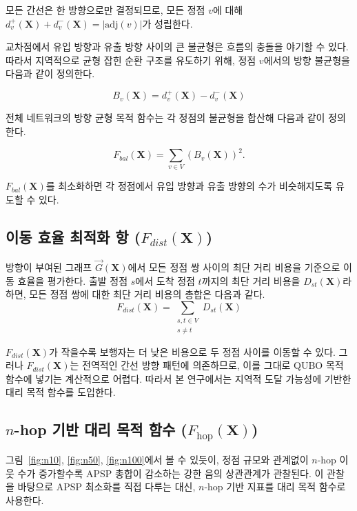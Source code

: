 \documentclass[11pt,a4paper]{article}
\begin{document}
모든 간선은 한 방향으로만 결정되므로, 모든 정점 $v$에 대해
$d_v^+ (\mathbf{X}) + d_v^- (\mathbf{X}) = |\mathrm{adj}(v)|$가 성립한다.

교차점에서 유입 방향과 유출 방향 사이의 큰 불균형은 흐름의 충돌을
야기할 수 있다.
따라서 지역적으로 균형 잡힌 순환 구조를 유도하기 위해, 정점 $v$에서의
방향 불균형을 다음과 같이 정의한다.

\begin{equation}
B_v(\mathbf{X}) = d_v^+ (\mathbf{X}) - d_v^- (\mathbf{X})
\end{equation}

전체 네트워크의 방향 균형 목적 함수는 각 정점의 불균형을 합산해
다음과 같이 정의한다.

\begin{equation}
F_{bal}(\mathbf{X}) = \sum_{v \in V}(B_v(\mathbf{X}))^2.
\end{equation}

$F_{bal}(\mathbf{X})$를 최소화하면 각 정점에서 유입 방향과 유출 방향의
수가 비슷해지도록 유도할 수 있다.

\subsection{이동 효율 최적화 항 ($F_{dist}(\mathbf{X})$)}
방향이 부여된 그래프 $\vec{G}(\mathbf{X})$에서 모든 정점 쌍 사이의
최단 거리 비용을 기준으로 이동 효율을 평가한다.
출발 정점 $s$에서 도착 정점 $t$까지의 최단 거리 비용을
$D_{st}(\mathbf{X})$라 하면, 모든 정점 쌍에 대한 최단 거리 비용의 총합은
다음과 같다.
\begin{equation}
F_{dist}(\mathbf{X}) =
\sum_{\substack{s,t \in V\\s \neq t}} D_{st}(\mathbf{X})
\end{equation}

$F_{dist}(\mathbf{X})$가 작을수록 보행자는 더 낮은 비용으로 두 정점
사이를 이동할 수 있다.
그러나 $F_{dist}(\mathbf{X})$는 전역적인 간선 방향 패턴에 의존하므로,
이를 그대로 QUBO 목적 함수에 넣기는 계산적으로 어렵다.
따라서 본 연구에서는 지역적 도달 가능성에 기반한 대리 목적 함수를
도입한다.

\subsection{$n$-hop 기반 대리 목적 함수 ($F_{\mathrm{hop}}(\mathbf{X})$)}
그림~\ref{fig:n10}, \ref{fig:n50}, \ref{fig:n100}에서 볼 수 있듯이,
정점 규모와 관계없이 $n$-hop 이웃 수가 증가할수록 APSP 총합이 감소하는
강한 음의 상관관계가 관찰된다.
이 관찰을 바탕으로 APSP 최소화를 직접 다루는 대신, $n$-hop 기반 지표를
대리 목적 함수로 사용한다.
\end{document}

